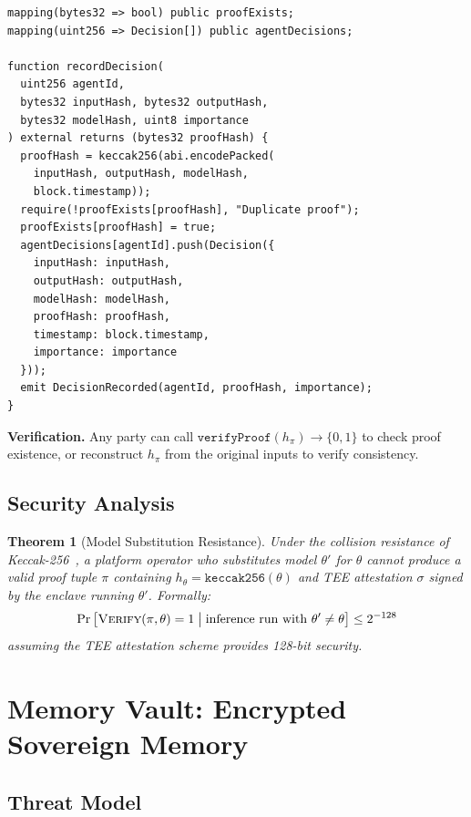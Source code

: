 \documentclass[10pt,a4paper]{article}
\theoremstyle{definition}
\theoremstyle{plain}
\newtheorem{theorem}{Theorem}[section]
\begin{document}
\begin{lstlisting}[caption={DecisionChain: anti-replay proof recording (Solidity, simplified).}]
mapping(bytes32 => bool) public proofExists;
mapping(uint256 => Decision[]) public agentDecisions;

function recordDecision(
  uint256 agentId,
  bytes32 inputHash, bytes32 outputHash,
  bytes32 modelHash, uint8 importance
) external returns (bytes32 proofHash) {
  proofHash = keccak256(abi.encodePacked(
    inputHash, outputHash, modelHash,
    block.timestamp));
  require(!proofExists[proofHash], "Duplicate proof");
  proofExists[proofHash] = true;
  agentDecisions[agentId].push(Decision({
    inputHash: inputHash,
    outputHash: outputHash,
    modelHash: modelHash,
    proofHash: proofHash,
    timestamp: block.timestamp,
    importance: importance
  }));
  emit DecisionRecorded(agentId, proofHash, importance);
}
\end{lstlisting}

\noindent\textbf{Verification.} Any party can call $\texttt{verifyProof}(h_\pi) \to \{0, 1\}$ to check proof existence, or reconstruct $h_\pi$ from the original inputs to verify consistency.

\subsection{Security Analysis}

\begin{theorem}[Model Substitution Resistance]\label{thm:sealed}
Under the collision resistance of Keccak-256~\cite{keccak2012}, a platform operator who substitutes model $\theta'$ for $\theta$ cannot produce a valid proof tuple $\pi$ containing $h_\theta = \texttt{keccak256}(\theta)$ and TEE attestation $\sigma$ signed by the enclave running $\theta'$. Formally:
$$\Pr\big[\textsc{Verify}(\pi, \theta) = 1 \;\big|\; \text{inference run with } \theta' \neq \theta\big] \leq 2^{-128}$$
assuming the TEE attestation scheme provides 128-bit security.
\end{theorem}


\section{Memory Vault: Encrypted Sovereign Memory}
\label{sec:memory}

\subsection{Threat Model}
\end{document}
